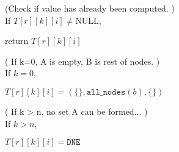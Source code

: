 \documentclass[11pt]{article}
\begin{document}
\begin{indentmore}
    (Check if value has already been computed. )\\
    If $T[r][k][i] \neq \text{NULL}$,

       \begin{indentmore}
       return $T[r][k][i]$
       \end{indentmore}

    ( If k=0, A is empty, B is rest of nodes. )\\
    If $k = 0$,
       \begin{indentmore}
       $T[r][k][i] = (\{\}, {\mathtt{all\_nodes}(b)}, \{\})$
       \end{indentmore}

    ( If k > n, no set A can be formed... )\\
    If $k > n$,\\
       \begin{indentmore}
       $T[r][k][i] = \mathtt{DNE}$
       \end{indentmore}


\end{indentmore}
\end{document}
